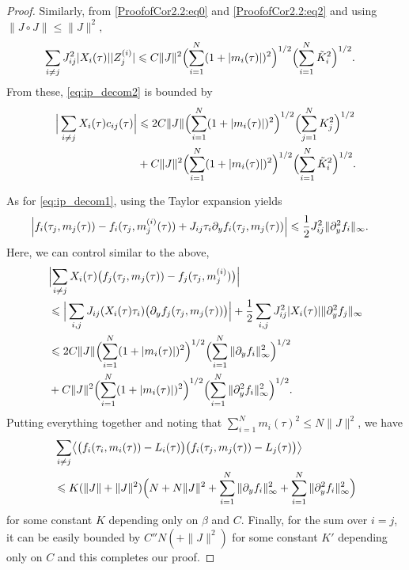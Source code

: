 \documentclass[10pt,a4paper]{amsart}
\let\gt=\tau \let\gth=\vartheta
\newcommand{\la}{\langle}
\renewcommand{\le}{\leqslant}
\renewcommand{\leq}{\leqslant}
\newcommand{\mvgt}{{\tau}}
\newcommand{\ra}{\rangle}
\begin{document}
\begin{proof}
Similarly, from \eqref{ProofofCor2.2:eq0} and \eqref{ProofofCor2.2:eq2} and using $\|J\circ J\|\leq \|J\|^2,$
\begin{align*}
     \sum_{i \ne j} J_{ij}^2|X_i(\tau)||Z_j^{(i)}|  
    &\leq C\|J\|^2\Bigl(\sum_{i=1}^N(1+|m_i(\tau)|)^2\Bigr)^{1/2}\Bigl(\sum_{i=1}^N\tilde K_i^2\Bigr)^{1/2}.
\end{align*}
From these, \eqref{eq:ip_decom2} is bounded by
\begin{align*}
  \Big| \sum_{i \ne j} X_i(\tau) c_{ij}(\tau) \Big |&\leq 2 C\|J\|\Bigl(\sum_{i=1}^N(1+|m_i(\tau)|)^2\Bigr)^{1/2}\Bigl(\sum_{j=1}^NK_j^2\Bigr)^{1/2}\\
&+C\|J\|^2\Bigl(\sum_{i=1}^N(1+|m_i(\tau)|)^2\Bigr)^{1/2}\Bigl(\sum_{i=1}^N\tilde K_i^2\Bigr)^{1/2}.
\end{align*}


As for \eqref{eq:ip_decom1}, using the Taylor expansion yields
\begin{align*}
    \Bigl|f_i(\tau_j,m_j(\mvgt))-f_i(\tau_j,m_j^{(i)}(\mvgt))+J_{ij}\tau_i\partial_yf_i(\tau_j, m_j(\mvgt))\Bigr|&\leq \frac{1}{2}J_{ij}^2\|\partial^2_{y}f_i\|_\infty.
\end{align*}
Here, we can control similar to the above,
\begin{align*}
   &\Bigl| \sum_{i\neq j}X_i(\tau)\bigl(f_j(\tau_j, m_j(\mvgt))-f_j(\tau_j,m_j^{(i)})\bigr)\Bigr| \\
   &\le \Big| \sum_{i, j} J_{ij} (X_i(\tau) \tau_i ) \big(\partial_yf_j(\tau_j,m_j(\mvgt)) \big) \Big|  + \frac12  \sum_{i, j} J_{ij}^2|X_i(\gt)|\|\partial^2_y f_j\|_{\infty}  \\
   &\leq 2C\|J\|\Bigl(\sum_{i=1}^N(1+|m_i(\tau)|)^2\Bigr)^{1/2}\Bigl(\sum_{i=1}^N\|\partial_yf_i\|_\infty^2\Bigr)^{1/2}\\
&+C\|J\|^2\Bigl(\sum_{i=1}^N(1+|m_i(\tau)|)^2\Bigr)^{1/2}\Bigl(\sum_{i=1}^N\|\partial_y^2f_i\|_\infty^2\Bigr)^{1/2}.
\end{align*}
Putting everything together and noting that $\sum_{i=1}^Nm_i(\tau)^2\leq N\|J\|^2$, we have
\begin{align*}
   &\sum_{i\neq j}\bigl\la \bigl(f_i(\tau_i, m_i(\mvgt) )-L_i(\mvgt)\bigr)\bigl(f_i(\tau_j, m_j(\mvgt) )-L_j(\mvgt)\bigr)\bigr\ra\\
   &\leq K(\|J\|+\|J\|^2)\Bigl(N+N\|J\|^2+\sum_{i=1}^N\|\partial_y f_i\|_\infty^2+\sum_{i=1}^N\|\partial_y^2f_i\|_\infty^2\Bigr)
\end{align*}
for some constant $K$ depending only on $\beta$ and $C.$ 
Finally, for the sum over $i=j$, it can be easily bounded by $C''N(+\|J\|^2)$ for some constant $K'$ depending only on $C$ and this completes our proof.


\end{proof}
\end{document}

